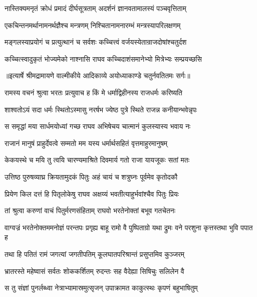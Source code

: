 \twolineshloka
{नास्तिक्यमनृतं क्रोधं प्रमादं दीर्घसूत्रताम्}
{अदर्शनं ज्ञानवतामालस्यं पञ्चवृत्तिताम्} %

\twolineshloka
{एकचिन्तनमर्थानामनर्थज्ञैश्च मन्त्रणम्}
{निश्चितानामनारम्भं मन्त्रस्यापरिलक्षणम्} %

\twolineshloka
{मङ्गलस्याप्रयोगं च प्रत्युत्थानं च सर्वशः}
{कच्चित्त्वं वर्जयस्येतान्राजदोषांश्चतुर्दश} %

\twolineshloka
{कच्चित्स्वादुकृतं भोज्यमेको नाश्नासि राघव}
{कच्चिदाशंसमानेभ्यो मित्रेभ्यः सम्प्रयच्छसि} %


{॥इत्यार्षे श्रीमद्रामायणे वाल्मीकीये आदिकाव्ये अयोध्याकाण्डे चतुर्नवतितमः सर्गः॥}


\twolineshloka
{रामस्य वचनं श्रुत्वा भरतः प्रत्युवाच ह}
{किं मे धर्माद्विहीनस्य राजधर्मः करिष्यति} %

\twolineshloka
{शाश्वतोऽयं सदा धर्मः स्थितोऽस्मासु नरर्षभ}
{ज्येष्ठ पुत्रे स्थिते राजन्न कनीयान्भवेन्नृपः} %

\twolineshloka
{स समृद्धां मया सार्धमयोध्यां गच्छ राघव}
{अभिषेचय चात्मानं कुलस्यास्य भवाय नः} %

\twolineshloka
{राजानं मानुषं प्राहुर्देवत्वे सम्मतो मम}
{यस्य धर्मार्थसहितं वृत्तमाहुरमानुषम्} %

\twolineshloka
{केकयस्थे च मयि तु त्वयि चारण्यमाश्रिते}
{दिवमार्य गतो राजा यायजूकः सतां मतः} %

\twolineshloka
{उत्तिष्ठ पुरुषव्याघ्र क्रियतामुदकं पितुः}
{अहं चायं च शत्रुघ्नः पूर्वमेव कृतोदकौ} %

\twolineshloka
{प्रियेण किल दत्तं हि पितृलोकेषु राघव}
{अक्षय्यं भवतीत्याहुर्भवांश्चैव पितुः प्रियः} %

\twolineshloka
{तां श्रुत्वा करुणां वाचं पितुर्मरणसंहिताम्}
{राघवो भरतेनोक्तां बभूव गतचेतनः} %

\threelineshloka
{वाग्वज्रं भरतेनोक्तममनोज्ञं परन्तपः}
{प्रगृह्य बाहू रामो वै पुष्पिताग्रो यथा द्रुमः}
{वने परशुना कृत्तस्तथा भुवि पपात ह} %

\twolineshloka
{तथा हि पतितं रामं जगत्यां जगतीपतिम्}
{कूलघातपरिश्रान्तं प्रसुप्तमिव कुञ्जरम्} %

\twolineshloka
{भ्रातरस्ते महेष्वासं सर्वतः शोककर्शितम्}
{रुदन्तः सह वैदेह्या सिषिचुः सलिलेन वै} %

\twolineshloka
{स तु संज्ञां पुनर्लब्ध्वा नेत्राभ्यामास्रमुत्सृजन्}
{उपाक्रामत काकुत्स्थः कृपणं बहुभाषितुम्} %

